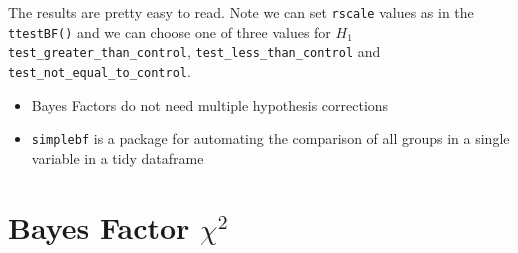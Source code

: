 \documentclass[
]{book}
\providecommand{\tightlist}{%
  \setlength{\itemsep}{0pt}\setlength{\parskip}{0pt}}
\newenvironment{roundup}
{ \begin{tcolorbox}[colbacktitle=yellow!50!white,
title=Round Up,coltitle=black,
fonttitle=\bfseries] }
{  \end{tcolorbox} }
\begin{document}
The results are pretty easy to read. Note we can set \texttt{rscale} values as in the \texttt{ttestBF()} and we can choose one of three values for \(H_1\) \texttt{test\_greater\_than\_control}, \texttt{test\_less\_than\_control} and \texttt{test\_not\_equal\_to\_control}.

\begin{roundup}
\begin{itemize}
\tightlist
\item
  Bayes Factors do not need multiple hypothesis corrections
\item
  \texttt{simplebf} is a package for automating the comparison of all groups in a single variable in a tidy dataframe
\end{itemize}
\end{roundup}

\hypertarget{bayes-factor-chi2}{%
\chapter{\texorpdfstring{Bayes Factor \(\chi^2\)}{Bayes Factor \textbackslash chi\^{}2}}\label{bayes-factor-chi2}}

  
\end{document}
